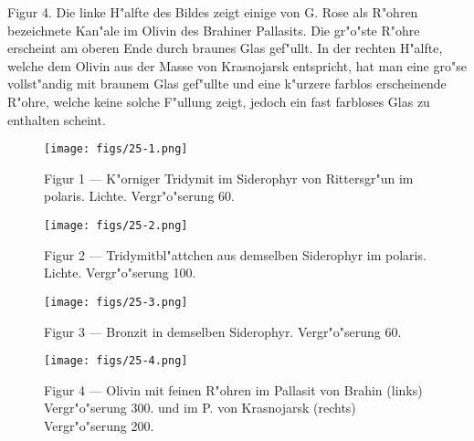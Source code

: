\documentclass[a4paper, 11pt, oneside, polutonikogreek, german]{article}
\begin{document}
Figur 4. Die linke H"alfte des Bildes zeigt einige von G. Rose als R"ohren bezeichnete Kan"ale im Olivin des Brahiner Pallasits. Die gr"o"ste R"ohre erscheint am oberen Ende durch braunes Glas gef"ullt. In der rechten H"alfte, welche dem Olivin aus der Masse von Krasnojarsk entspricht, hat man eine gro"se vollst"andig mit braunem Glas gef"ullte und eine k"urzere farblos erscheinende R"ohre, welche keine solche F"ullung zeigt, jedoch ein fast farbloses Glas zu enthalten scheint.
\clearpage

\vspace*{\fill}
\begin{figure}[H]
\centering
\texttt{[image: figs/25-1.png]}
\caption{\small Figur 1 --- K"orniger Tridymit im Siderophyr von Rittersgr"un im polaris. Lichte. Vergr"o"serung 60.}
\end{figure}
\vspace*{\fill}
\clearpage

\vspace*{\fill}
\begin{figure}[H]
\centering
\texttt{[image: figs/25-2.png]}
\caption{\small Figur 2 --- Tridymitbl"attchen aus demselben Siderophyr im polaris. Lichte. Vergr"o"serung 100.}
\end{figure}
\vspace*{\fill}
\clearpage

\vspace*{\fill}
\begin{figure}[H]
\centering
\texttt{[image: figs/25-3.png]}
\caption{\small Figur 3 --- Bronzit in demselben Siderophyr. Vergr"o"serung 60.}
\end{figure}
\vspace*{\fill}
\clearpage

\vspace*{\fill}
\begin{figure}[H]
\centering
\texttt{[image: figs/25-4.png]}
\caption{\small Figur 4 --- Olivin mit feinen R"ohren im Pallasit von Brahin (links) Vergr"o"serung 300. und im P. von Krasnojarsk (rechts) Vergr"o"serung 200.}
\end{figure}
\vspace*{\fill}
\clearpage
\end{document}
